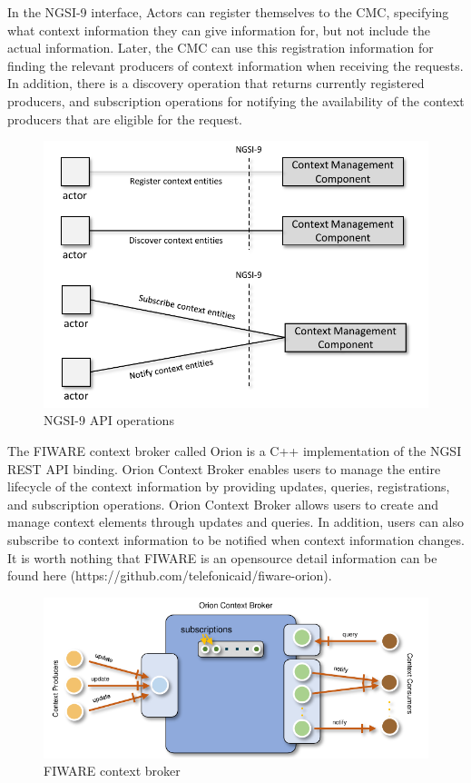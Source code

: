 In the NGSI-9 interface, Actors can register themselves to the CMC, specifying what context information they can give information for, but not include the actual information. Later, the CMC can use this registration information for finding the relevant producers of context information when receiving the requests. In addition, there is a discovery operation that returns currently registered producers, and subscription operations for notifying the availability of the context producers that are eligible for the request.

\begin{figure}[H]			%
	\centering
	\includegraphics[width=\textwidth]{figures/fig_NGSI_9_api.pdf}
    \caption{NGSI-9 API operations}
    \label{fig:ngis_9_api_operation}
\end{figure}

The FIWARE context broker called Orion is a C++ implementation of the NGSI REST API binding. Orion Context Broker enables users to manage the entire lifecycle of the context information by providing updates, queries, registrations, and subscription operations.  Orion Context Broker allows users to create and manage context elements through updates and queries. In addition, users can also subscribe to context information to be notified when context information changes. It is worth nothing that FIWARE is an opensource detail information can be found here (https://github.com/telefonicaid/fiware-orion).

\begin{figure}[H]			%
	\centering
	\includegraphics[width=\textwidth]{figures/fig_FIWARE_context_broker.pdf}
    \caption{FIWARE context broker}
    \label{fig:context_broker}
\end{figure}

